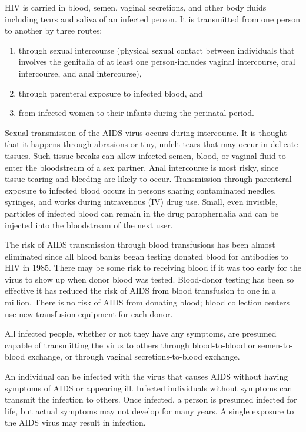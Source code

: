 HIV is carried in blood, semen, vaginal secretions, and other body fluids including tears and
saliva of an infected person. It is transmitted from one person to another by three routes: 
\begin{enumerate}
\item through sexual intercourse (physical sexual contact between individuals that involves the
genitalia of at least one person-includes vaginal intercourse, oral intercourse, and anal
intercourse),
\item through parenteral exposure to infected blood, and
\item from infected women to
their infants during the perinatal period.
\end{enumerate}

Sexual transmission of the AIDS virus occurs during intercourse. It is thought that it happens
through abrasions or tiny, unfelt tears that may occur in delicate tissues. Such tissue breaks
can allow infected semen, blood, or vaginal fluid to enter the bloodstream of a sex partner.
Anal intercourse is most risky, since tissue tearing and bleeding are likely to occur.
Transmission through parenteral exposure to infected blood occurs in persons sharing
contaminated needles, syringes, and works during intravenous (IV) drug use. Small, even
invisible, particles of infected blood can remain in the drug paraphernalia and can be injected
into the bloodstream of the next user.

The risk of AIDS transmission through blood transfusions has been almost eliminated since
all blood banks began testing donated blood for antibodies to HIV in 1985. There may be
some risk to receiving blood if it was too early for the virus to show up when donor blood was
tested. Blood-donor testing has been so effective it has reduced the risk of AIDS from blood
transfusion to one in a million. There is no risk of AIDS from donating blood; blood collection
centers use new transfusion equipment for each donor.

All infected people, whether or not they have any symptoms, are presumed capable of
transmitting the virus to others through blood-to-blood or semen-to-blood exchange, or
through vaginal secretions-to-blood exchange.

An individual can be infected with the virus that causes AIDS without having symptoms of
AIDS or appearing ill. Infected individuals without symptoms can transmit the infection to
others. Once infected, a person is presumed infected for life, but actual symptoms may not
develop for many years. A single exposure to the AIDS virus may result in infection.

